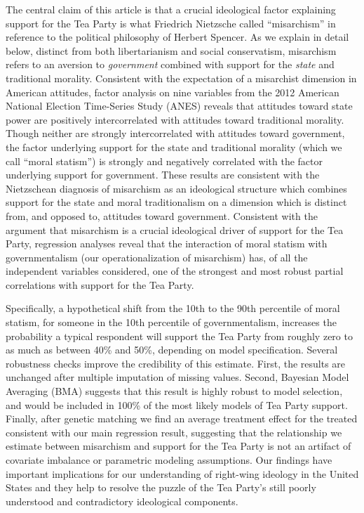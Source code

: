 \documentclass[12pt,]{article}
\begin{document}
The central claim of this article is that a crucial ideological factor
explaining support for the Tea Party is what Friedrich Nietzsche called
``misarchism'' in reference to the political philosophy of Herbert
Spencer. As we explain in detail below, distinct from both
libertarianism and social conservatism, misarchism refers to an aversion
to \emph{government} combined with support for the \emph{state} and
traditional morality. Consistent with the expectation of a misarchist
dimension in American attitudes, factor analysis on nine variables from
the 2012 American National Election Time-Series Study (ANES) reveals
that attitudes toward state power are positively intercorrelated with
attitudes toward traditional morality. Though neither are strongly
intercorrelated with attitudes toward government, the factor underlying
support for the state and traditional morality (which we call ``moral
statism'') is strongly and negatively correlated with the factor
underlying support for government. These results are consistent with the
Nietzschean diagnosis of misarchism as an ideological structure which
combines support for the state and moral traditionalism on a dimension which is
distinct from, and opposed to, attitudes toward government. Consistent
with the argument that misarchism is a crucial ideological driver of
support for the Tea Party, regression analyses reveal that the
interaction of moral statism with governmentalism (our
operationalization of misarchism) has, of all the independent variables
considered, one of the strongest and most robust partial correlations
with support for the Tea Party.

Specifically, a hypothetical shift from the 10th to the 90th percentile
of moral statism, for someone in the 10th percentile of governmentalism,
increases the probability a typical respondent will support the Tea
Party from roughly zero to as much as between 40\% and 50\%, depending
on model specification. Several robustness checks improve the
credibility of this estimate. First, the results are unchanged after
multiple imputation of missing values. Second, Bayesian Model Averaging
(BMA) suggests that this result is highly robust to model selection, and
would be included in 100\% of the most likely models of Tea Party
support. Finally, after genetic matching we find an average treatment
effect for the treated consistent with our main regression result,
suggesting that the relationship we estimate between misarchism and
support for the Tea Party is not an artifact of covariate imbalance or
parametric modeling assumptions. Our findings have important
implications for our understanding of right-wing ideology in the United
States and they help to resolve the puzzle of the Tea Party's still
poorly understood and contradictory ideological components.
\end{document}
